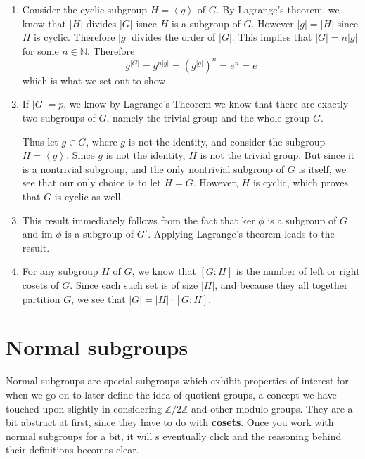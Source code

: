     \begin{prf}
        \begin{enumerate}
            \item Consider the cyclic subgroup $H = \left<g\right>$ of $G$. By
            Lagrange's theorem, we know that $|H|$ divides $|G|$ isnce
            $H$ is a subgroup of $G$. However $|g| = |H|$ since $H$ is
            cyclic. Therefore $|g|$ divides the order of $|G|$. This
            implies that $|G| = n|g|$ for some $n \in \mathbb{N}$.
            Therefore 
            \[
                g^{|G|} = g^{n|g|} = (g^{|g|})^n = e^n = e
            \]
            which is what we set out to show.

            \item If $|G| = p$, we know by Lagrange's Theorem we know
            that there are exactly two subgroups of $G$, namely the
            trivial group and the whole group $G$.

            Thus let $g \in G$, where $g$ is not the identity, 
            and consider the subgroup $H = \left< g
            \right>$. Since $g$ is not the identity, $H$ is not the
            trivial group. But since it is a nontrivial subgroup, and
            the only nontrivial subgroup of $G$ is itself, we see that our
            only choice is to let $H = G$. However, $H$ is cyclic,
            which proves that $G$ is cyclic as well.

            \item This result immediately follows from the fact that
            $\mbox{ker } \phi$ is a subgroup of $G$ and $\mbox{im }\phi$ is a
            subgroup of $G'$. Applying Lagrange's theorem leads to the
            result.
            
            \item For any subgroup $H$ of $G$, we know that $[G:H]$ is
            the number of left or right cosets of $G$. Since each such
            set is of size $|H|$, and because they all together
            partition $G$, we see that $|G| = |H| \cdot [G:H]$.
        \end{enumerate}
    \end{prf}
    \newpage
    \section{Normal subgroups}

    Normal subgroups are special subgroups which exhibit properties of
    interest for when we go on to later define the idea of quotient
    groups, a concept we have touched upon slightly in considering
    $\mathbb{Z}/2\mathbb{Z}$ and other modulo groups. They are a bit
    abstract at first, since they have to do with \textbf{cosets}.
    Once you work with normal subgroups for a bit, it will s
    eventually click and the reasoning behind their definitions
    becomes clear. 

